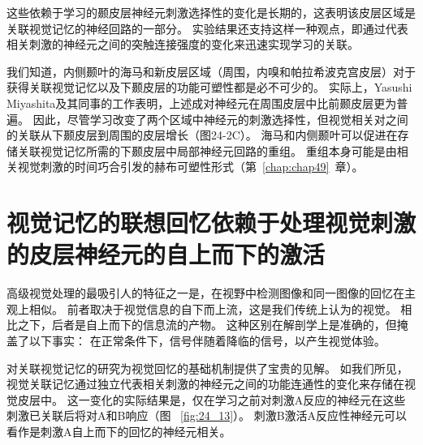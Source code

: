 这些依赖于学习的颞皮层神经元刺激选择性的变化是长期的，这表明该皮层区域是关联视觉记忆的神经回路的一部分。
实验结果还支持这样一种观点，即通过代表相关刺激的神经元之间的突触连接强度的变化来迅速实现学习的关联。


我们知道，内侧颞叶的海马和新皮层区域（周围，内嗅和帕拉希波克宫皮层）对于获得关联视觉记忆以及下颞皮层的功能可塑性都是必不可少的。
实际上，Yasushi Miyashita及其同事的工作表明，上述成对神经元在周围皮层中比前颞皮层更为普遍。
因此，尽管学习改变了两个区域中神经元的刺激选择性，但视觉相关对之间的关联从下颞皮层到周围的皮层增长（图24-2C）。
海马和内侧颞叶可以促进在存储关联视觉记忆所需的下颞皮层中局部神经元回路的重组。
重组本身可能是由相关视觉刺激的时间巧合引发的赫布可塑性形式（第~\ref{chap:chap49}~章）。



\section{视觉记忆的联想回忆依赖于处理视觉刺激的皮层神经元的自上而下的激活}

高级视觉处理的最吸引人的特征之一是，在视野中检测图像和同一图像的回忆在主观上相似。
前者取决于视觉信息的自下而上流，这是我们传统上认为的视觉。
相比之下，后者是自上而下的信息流的产物。
这种区别在解剖学上是准确的，但掩盖了以下事实：
在正常条件下，信号伴随着降临的信号，以产生视觉体验。


对关联视觉记忆的研究为视觉回忆的基础机制提供了宝贵的见解。
如我们所见，视觉关联记忆通过独立代表相关刺激的神经元之间的功能连通性的变化来存储在视觉皮层中。
这一变化的实际结果是，仅在学习之前对刺激A反应的神经元在这些刺激已关联后将对A和B响应（图 ~\ref{fig:24_13}）。
刺激B激活A反应性神经元可以看作是刺激A自上而下的回忆的神经元相关。


